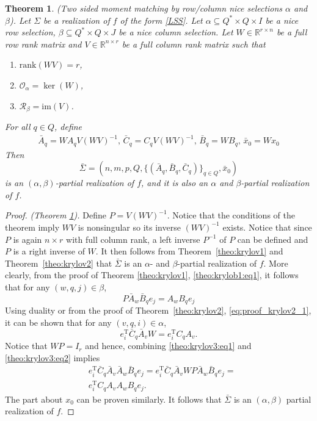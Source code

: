 \documentclass[journal]{IEEEtran}
\newcommand{\IM}{\mathrm{im}}
\newcommand{\Rank}{\mathrm{rank}}
\newtheorem{Theorem}{Theorem}
\begin{document}
\begin{Theorem} \label{theo:krylov3}
	\emph{(Two sided moment matching by row/column nice selections $\alpha$ and $\beta$).}
	Let $\Sigma$ be a realization of $f$ of the form \eqref{LSS}. Let $\alpha \subseteq Q^* \times Q \times I$ be a nice row selection, $\beta \subseteq Q^* \times Q \times J$ be a nice column selection. Let $W \in \mathbb{R}^{r \times n}$ be a full row rank matrix and $V \in \mathbb{R}^{n \times r}$ be a full column rank matrix such that
	\begin{enumerate}
		\item $\Rank (WV)=r$,
		\item $\mathscr{O}_{\alpha} = \ker (W)$,
		\item $\mathscr{R}_{\beta} = \IM (V)$.
	\end{enumerate}
	For all $q \in Q$, define
	\[
	\begin{split}
	\bar{A}_q=WA_qV(WV)^{-1} \mbox{, } \bar{C}_q=C_qV(WV)^{-1} \mbox{, } \bar{B}_q=WB_q \mbox{, } \bar{x}_0=Wx_0
	\end{split}
	\]
	Then
	\[ \bar{\Sigma}=(n,m,p,Q,\{(\bar{A}_q,\bar{B}_q,\bar{C}_q)\}_{q \in Q},\bar{x}_0) \]
	is an $(\alpha,\beta)$-partial realization of $f$, and it is also an $\alpha$ and $\beta$-partial realization of $f$.
\end{Theorem}

\begin{proof}\emph{(Theorem \ref{theo:krylov3}).}
	Define $P=V(WV)^{-1}$. Notice that the conditions of the theorem imply $WV$ is nonsingular so its inverse $(WV)^{-1}$ exists. Notice that since $P$ is again $n \times r$ with full column rank, a left inverse $P^{-1}$ of $P$ can be defined and $P$ is a right inverse of $W$. It then follows from Theorem~\ref{theo:krylov1} and Theorem~\ref{theo:krylov2} that $\bar{\Sigma}$ is an $\alpha$- and $\beta$-partial realization of $f$. More clearly, from the proof of Theorem \ref{theo:krylov1}, \eqref{theo:krylob1:eq1}, it follows that for any $(w,q,j) \in \beta$,
	\begin{equation} \label{theo:krylov3:eq1} 
		P\bar{A}_w\bar{B}_qe_j=A_wB_qe_j
	\end{equation}
	Using duality or from the proof of Theorem~\ref{theo:krylov2}, \eqref{eq:proof_krylov2_1}, it can be shown that for any $(v,q,i) \in \alpha$,
	\begin{equation} \label{theo:krylov3:eq2}
		e_i^{\mathrm{T}}\bar{C}_q\bar{A}_v W = e_i^{\mathrm{T}}C_qA_v.
	\end{equation}
	Notice that $WP=I_r$ and hence, combining \eqref{theo:krylov3:eq1} and \eqref{theo:krylov3:eq2} implies
	\begin{align*}
		& e_i^{\mathrm{T}}\bar{C}_q\bar{A}_v\bar{A}_w\bar{B}_qe_j = e_i^{\mathrm{T}}\bar{C}_q\bar{A}_vWP\bar{A}_w\bar{B}_qe_j = \\
		& e_i^{\mathrm{T}}C_qA_vA_wB_qe_j.
	\end{align*}
	The part about $x_0$ can be proven similarly. It follows that $\bar{\Sigma}$ is an $(\alpha,\beta)$ partial realization of $f$. 
\end{proof}
\end{document}
